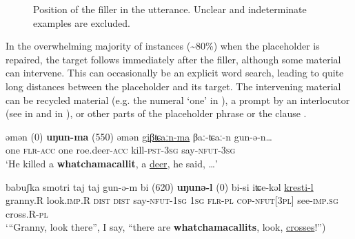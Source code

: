 \documentclass[output=paper]{langscibook}
\begin{document}
\begin{figure}
\caption{Position of the filler in the utterance. Unclear and indeterminate examples are excluded.}
\label{fig:pakendorf:10}
\end{figure}

In the overwhelming majority of instances ({\textasciitilde}80\%) when the placeholder is repaired, the target follows immediately after the filler, although some material can intervene. This can occasionally be an explicit word search, leading to quite long distances between the placeholder and its target. The intervening material can be recycled material (e.g. the numeral ‘one’ in ), a prompt by an interlocutor (see  in  and  in ), or other parts of the placeholder phrase or the clause . 


\ea \label{ex:pakendorf:12}
\gll əmən
	\textup{(0)}
	\textbf{uŋun-ma}
	\textup{(550)}
	əmən
	\uline{giβʨaːn-ma}
	βaː-ʨaː-n
	gun-ə-n…\\
    one
    {}
    \textsc{flr-acc}
    {}
    one
    roe.deer-\textsc{acc}
    kill-\textsc{pst-3sg}
    say-\textsc{nfut-3sg}\\
\glt ‘He killed a \textbf{whatchamacallit}, a \uline{deer}, he said, …’ 
\z

\ea \label{ex:pakendorf:13}
\gll babuʃka
	smotri
	taj
	taj
	gun-ə-m
	bi
	\textup{(620)}
	\textbf{uŋunə-l}
	\textup{(0)}
	bi-si
	iʨe-kəl
	\uline{kresti-l}\\
    granny.R
    look.\textsc{imp.}R
    \textsc{dist}
    \textsc{dist}
    say-\textsc{nfut-1sg}
    \textsc{1sg}
    {}
    \textsc{flr-pl}
    {}
    \textsc{cop}-\textsc{nfut[3pl]}
    see-\textsc{imp.sg}
    cross.R-\textsc{pl}\\
\glt ‘“Granny, look there”, I say, “there are \textbf{whatchamacallits}, look, \uline{crosses}!”) 
\z
\end{document}
